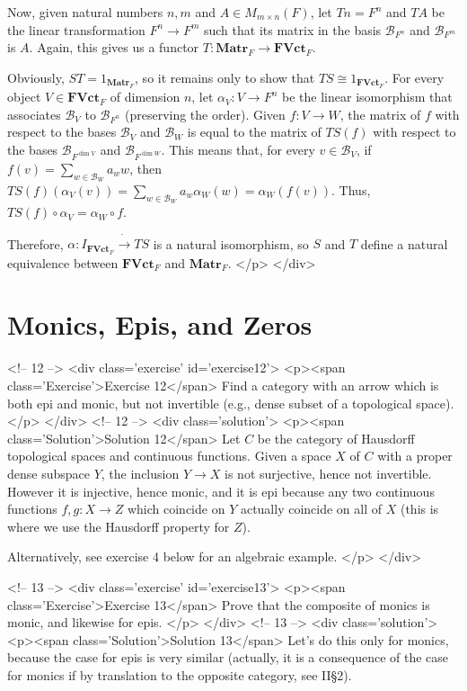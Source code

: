 Now, given natural numbers $n,m$ and $A\in M_{m\times n}(F)$, let $Tn=F^n$ and $TA$ be the linear transformation $F^n\to F^m$ such that its matrix in the basis $\mathscr{B}_{F^n}$ and $\mathscr{B}_{F^m}$ is $A$. Again, this gives us a functor $T:\mathbf{Matr}_F\to\mathbf{FVct}_F$.

Obviously, $ST=1_{\mathbf{Matr}_F}$, so it remains only to show that $TS\cong 1_{\mathbf{FVct}_F}$. For every object $V\in\mathbf{FVct}_F$ of dimension $n$, let $\alpha_V:V\to F^n$ be the linear isomorphism that associates $\mathscr{B}_V$ to $\mathscr{B}_{F^n}$ (preserving the order). Given $f:V\to W$, the matrix of $f$ with respect to the bases $\mathscr{B}_V$ and $\mathscr{B}_W$ is equal to the matrix of $TS(f)$ with respect to the bases $\mathscr{B}_{F^{\dim V}}$ and $\mathscr{B}_{F^{\dim W}}$. This means that, for every $v\in\mathscr{B}_V$, if $f(v)=\sum_{w\in\mathscr{B}_W}a_w w$, then $TS(f)(\alpha_V(v))=\sum_{w\in\mathscr{B}_W}a_w\alpha_W(w)=\alpha_W(f(v))$. Thus, $TS(f)\circ\alpha_V=\alpha_W\circ f$.

Therefore, $\alpha\colon I_{\mathbf{FVct}_F}\dot{\to} TS$ is a natural isomorphism, so $S$ and $T$ define a natural equivalence between $\mathbf{FVct}_F$ and $\mathbf{Matr}_F$.
</p>
</div>

\section{Monics, Epis, and Zeros}

<!-- 12 -->
<div class='exercise' id='exercise12'>
<p><span class='Exercise'>Exercise 12</span>
Find a category with an arrow which is both epi and monic, but not invertible (e.g., dense subset of a topological space).
</p>
</div>
<!-- 12 -->
<div class='solution'>
<p><span class='Solution'>Solution 12</span>
Let $C$ be the category of Hausdorff topological spaces and continuous functions. Given a space $X$ of $C$ with a proper dense subspace $Y$, the inclusion $Y\to X$ is not surjective, hence not invertible. However it is injective, hence monic, and it is epi because any two continuous functions $f,g\colon X\to Z$ which coincide on $Y$ actually coincide on all of $X$ (this is where we use the Hausdorff property for $Z$).

Alternatively, see exercise 4 below for an algebraic example.
</p>
</div>

<!-- 13 -->
<div class='exercise' id='exercise13'>
<p><span class='Exercise'>Exercise 13</span>
Prove that the composite of monics is monic, and likewise for epis.
</p>
</div>
<!-- 13 -->
<div class='solution'>
<p><span class='Solution'>Solution 13</span>
Let's do this only for monics, because the case for epis is very similar (actually, it is a consequence of the case for monics if by translation to the opposite category, see II\S 2).

